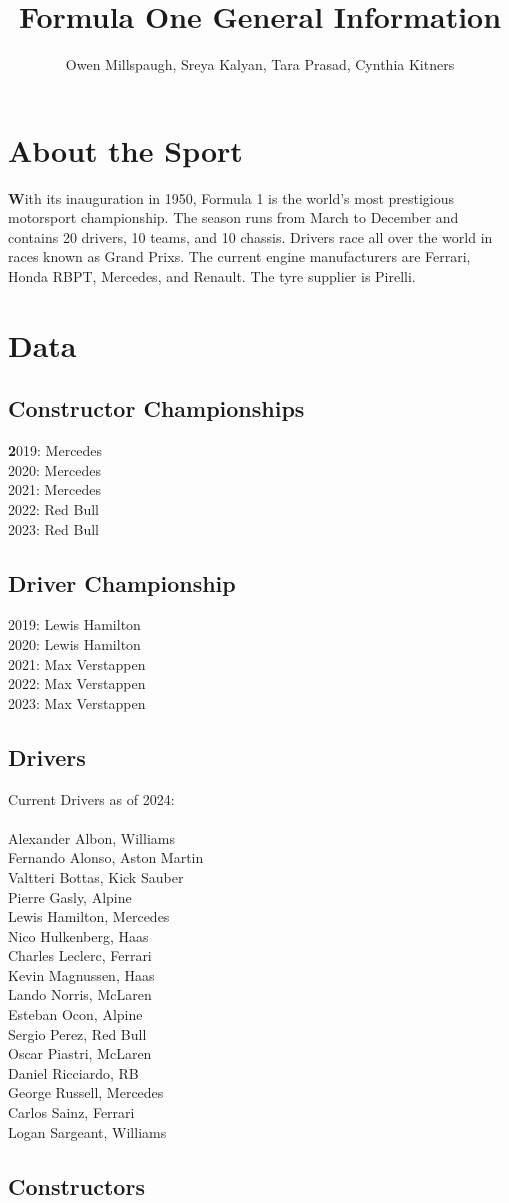 \documentclass[12pt]{article}
\title{Formula One General Information}
\author{Owen Millspaugh, Sreya Kalyan, Tara Prasad, Cynthia Kitners}
\begin{document}
\maketitle

\section{About the Sport}
\textbf With its inauguration in 1950, Formula 1 is the world's most prestigious motorsport championship. 
The season runs from March to December and contains 20 drivers, 10 teams, and 10 chassis.
Drivers race all over the world in races known as Grand Prixs.
The current engine manufacturers are Ferrari, Honda RBPT, Mercedes, and Renault. 
The tyre supplier is Pirelli.
\section{Data}
\subsection{Constructor Championships}
\textbf 2019: Mercedes\\
2020: Mercedes\\
2021: Mercedes\\
2022: Red Bull\\
2023: Red Bull
\subsection{Driver Championship}
2019: Lewis Hamilton\\
2020: Lewis Hamilton\\
2021: Max Verstappen\\
2022: Max Verstappen\\
2023: Max Verstappen
\subsection{Drivers}
Current Drivers as of 2024:\\
\\
Alexander Albon, Williams\\
Fernando Alonso, Aston Martin\\
Valtteri Bottas, Kick Sauber\\
Pierre Gasly, Alpine\\
Lewis Hamilton, Mercedes\\
Nico Hulkenberg, Haas\\
Charles Leclerc, Ferrari\\
Kevin Magnussen, Haas\\
Lando Norris, McLaren\\
Esteban Ocon, Alpine\\
Sergio Perez, Red Bull\\
Oscar Piastri, McLaren\\
Daniel Ricciardo, RB\\
George Russell, Mercedes\\
Carlos Sainz, Ferrari\\
Logan Sargeant, Williams\\


\subsection{Constructors}
\end{document}

